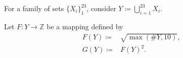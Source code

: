 \documentclass[varwidth=9cm]{standalone}
\begin{document}
For a family of sets $\{X_i\}_1^{23}$, consider $Y \coloneqq \bigcup_{i=1}^{23} X_i$.

Let $F\colon Y \to \mathbb{Z}$ be a mapping defined by
\begin{align}
    F(Y) \coloneqq{}& \sqrt{ \max( \# Y, 10 ) },\\
    G(Y) \coloneqq{}& F(Y)^2.
\end{align}
\end{document}
